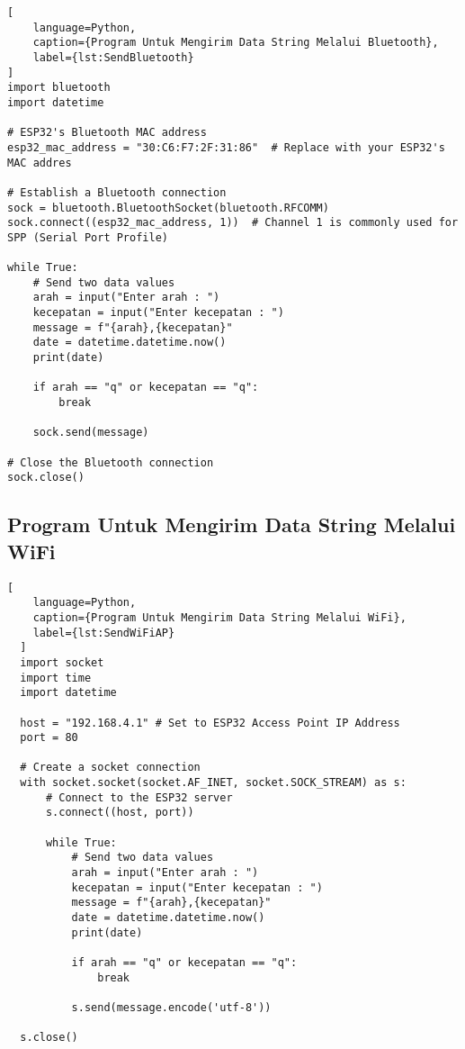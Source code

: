 \begin{lstlisting}[
    language=Python,
    caption={Program Untuk Mengirim Data String Melalui Bluetooth},
    label={lst:SendBluetooth}
]
import bluetooth
import datetime

# ESP32's Bluetooth MAC address
esp32_mac_address = "30:C6:F7:2F:31:86"  # Replace with your ESP32's MAC addres

# Establish a Bluetooth connection
sock = bluetooth.BluetoothSocket(bluetooth.RFCOMM)
sock.connect((esp32_mac_address, 1))  # Channel 1 is commonly used for SPP (Serial Port Profile)

while True:
    # Send two data values
    arah = input("Enter arah : ")
    kecepatan = input("Enter kecepatan : ")
    message = f"{arah},{kecepatan}"
    date = datetime.datetime.now()
    print(date)
    
    if arah == "q" or kecepatan == "q":
        break
    
    sock.send(message)

# Close the Bluetooth connection
sock.close()

\end{lstlisting}

\subsection{Program Untuk Mengirim Data String Melalui WiFi}

\begin{lstlisting}[
    language=Python,
    caption={Program Untuk Mengirim Data String Melalui WiFi},
    label={lst:SendWiFiAP}
  ]
  import socket
  import time
  import datetime
  
  host = "192.168.4.1" # Set to ESP32 Access Point IP Address
  port = 80
  
  # Create a socket connection
  with socket.socket(socket.AF_INET, socket.SOCK_STREAM) as s:
      # Connect to the ESP32 server
      s.connect((host, port))
      
      while True:
          # Send two data values
          arah = input("Enter arah : ")
          kecepatan = input("Enter kecepatan : ")
          message = f"{arah},{kecepatan}"
          date = datetime.datetime.now()
          print(date)
      
          if arah == "q" or kecepatan == "q":
              break
      
          s.send(message.encode('utf-8'))
          
  s.close()
  
\end{lstlisting}


